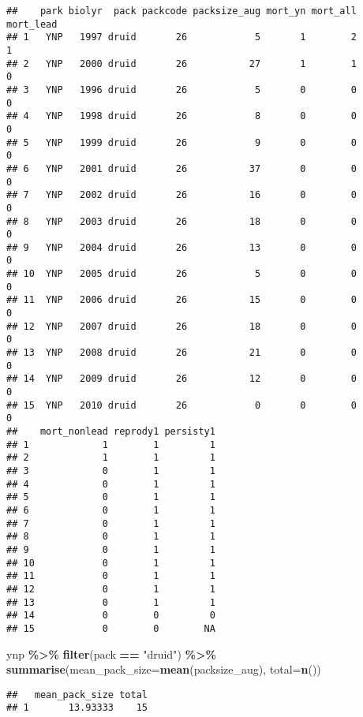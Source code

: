 \documentclass[
]{article}
\newenvironment{Shaded}{\begin{snugshade}}{\end{snugshade}}
\newcommand{\AttributeTok}[1]{\textcolor[rgb]{0.13,0.29,0.53}{#1}}
\newcommand{\FunctionTok}[1]{\textcolor[rgb]{0.13,0.29,0.53}{\textbf{#1}}}
\newcommand{\NormalTok}[1]{#1}
\newcommand{\SpecialCharTok}[1]{\textcolor[rgb]{0.81,0.36,0.00}{\textbf{#1}}}
\newcommand{\StringTok}[1]{\textcolor[rgb]{0.31,0.60,0.02}{#1}}
\begin{document}
\begin{verbatim}
##    park biolyr  pack packcode packsize_aug mort_yn mort_all mort_lead
## 1   YNP   1997 druid       26            5       1        2         1
## 2   YNP   2000 druid       26           27       1        1         0
## 3   YNP   1996 druid       26            5       0        0         0
## 4   YNP   1998 druid       26            8       0        0         0
## 5   YNP   1999 druid       26            9       0        0         0
## 6   YNP   2001 druid       26           37       0        0         0
## 7   YNP   2002 druid       26           16       0        0         0
## 8   YNP   2003 druid       26           18       0        0         0
## 9   YNP   2004 druid       26           13       0        0         0
## 10  YNP   2005 druid       26            5       0        0         0
## 11  YNP   2006 druid       26           15       0        0         0
## 12  YNP   2007 druid       26           18       0        0         0
## 13  YNP   2008 druid       26           21       0        0         0
## 14  YNP   2009 druid       26           12       0        0         0
## 15  YNP   2010 druid       26            0       0        0         0
##    mort_nonlead reprody1 persisty1
## 1             1        1         1
## 2             1        1         1
## 3             0        1         1
## 4             0        1         1
## 5             0        1         1
## 6             0        1         1
## 7             0        1         1
## 8             0        1         1
## 9             0        1         1
## 10            0        1         1
## 11            0        1         1
## 12            0        1         1
## 13            0        1         1
## 14            0        0         0
## 15            0        0        NA
\end{verbatim}

\begin{Shaded}
\begin{Highlighting}[]
\NormalTok{ynp }\SpecialCharTok{\%\textgreater{}\%} 
  \FunctionTok{filter}\NormalTok{(pack }\SpecialCharTok{==} \StringTok{"druid"}\NormalTok{) }\SpecialCharTok{\%\textgreater{}\%} 
  \FunctionTok{summarise}\NormalTok{(}\AttributeTok{mean\_pack\_size=}\FunctionTok{mean}\NormalTok{(packsize\_aug),}
            \AttributeTok{total=}\FunctionTok{n}\NormalTok{())}
\end{Highlighting}
\end{Shaded}

\begin{verbatim}
##   mean_pack_size total
## 1       13.93333    15
\end{verbatim}
\end{document}

